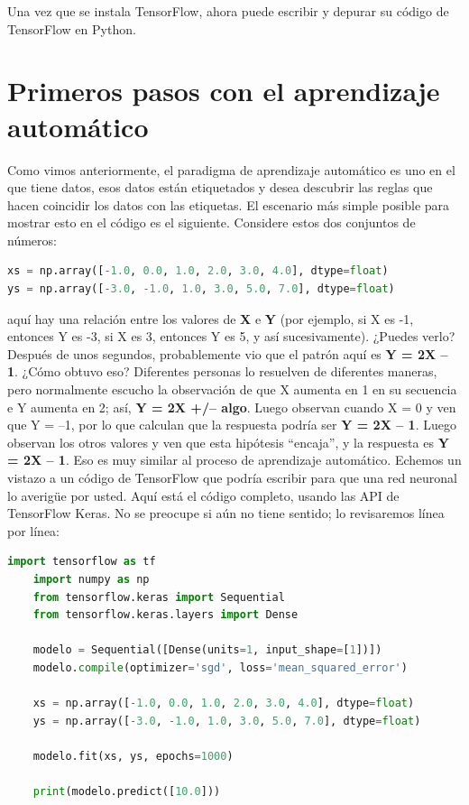 Una vez que se instala TensorFlow, ahora puede escribir y depurar su código de TensorFlow en Python.

\section{Primeros pasos con el aprendizaje automático}

Como vimos anteriormente, el paradigma de aprendizaje automático es uno en el que tiene datos, esos datos están etiquetados y desea descubrir las reglas que hacen coincidir los datos con las etiquetas. El escenario más simple posible para mostrar esto en el código es el siguiente. Considere estos dos conjuntos de números:

\begin{lstlisting}[language=python]
xs = np.array([-1.0, 0.0, 1.0, 2.0, 3.0, 4.0], dtype=float)
ys = np.array([-3.0, -1.0, 1.0, 3.0, 5.0, 7.0], dtype=float)
\end{lstlisting}

aquí hay una relación entre los valores de \textbf{X} e \textbf{Y} (por ejemplo, si X es -1, entonces Y es -3, si X es 3, entonces Y es 5, y así sucesivamente). ¿Puedes verlo? Después de unos segundos, probablemente vio que el patrón aquí es \textbf{Y = 2X – 1}. ¿Cómo obtuvo eso? Diferentes personas lo resuelven de diferentes maneras, pero normalmente escucho la observación de que X aumenta en 1 en su secuencia e Y aumenta en 2; así, \textbf{Y = 2X +/– algo}. Luego observan cuando X = 0 y ven que Y = –1, por lo que calculan que la respuesta podría ser \textbf{Y = 2X – 1}. Luego observan los otros valores y ven que esta hipótesis “encaja”, y la respuesta es \textbf{Y = 2X – 1}. Eso es muy similar al proceso de aprendizaje automático. Echemos un vistazo a un código de TensorFlow que podría escribir para que una red neuronal lo averigüe por usted. Aquí está el código completo, usando las API de TensorFlow Keras. No se preocupe si aún no tiene sentido; lo revisaremos línea por línea: 

\begin{lstlisting}[language=python]
	import tensorflow as tf
	import numpy as np
	from tensorflow.keras import Sequential
	from tensorflow.keras.layers import Dense
	
	modelo = Sequential([Dense(units=1, input_shape=[1])])
	modelo.compile(optimizer='sgd', loss='mean_squared_error')
	
	xs = np.array([-1.0, 0.0, 1.0, 2.0, 3.0, 4.0], dtype=float)
	ys = np.array([-3.0, -1.0, 1.0, 3.0, 5.0, 7.0], dtype=float)
	
	modelo.fit(xs, ys, epochs=1000)
	
	print(modelo.predict([10.0]))
\end{lstlisting}

